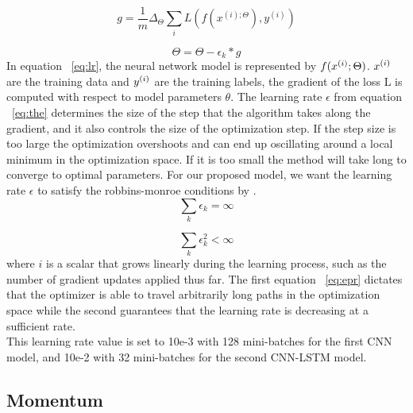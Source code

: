 \begin{equation}\label{eq:lr}
     g=\frac{1}{m}\Delta _{\Theta }\sum _{i}L(f(x^{(i);\Theta }), y^{(i)})
\end{equation}

\begin{equation}\label{eq:the}
    \Theta =\Theta -\epsilon _{k}*g
\end{equation}
In equation ~\ref{eq:lr}, the neural network model is represented by $\large f(x^{(i)};\Theta )$. $\large x^{(i)}$ are the training data and $\large y^{(i)}$  are the training labels, the gradient of the loss L is computed with respect to model parameters $\theta$. The learning rate $\epsilon$ from equation ~\ref{eq:the} determines the size of the step that the algorithm takes along the gradient, and it also controls the size of the optimization step. If the step size is too large the optimization overshoots and can end up oscillating around a local minimum in the optimization space. If it is too small the method will take long to converge to optimal parameters. For our proposed model, we want the learning rate $\epsilon$ to satisfy the robbins-monroe conditions by \cite{lecun2015deep}.
\begin{equation}\label{eq:epr}
     \sum _{k}\epsilon _{k}=\infty
\end{equation}

\begin{equation}
    \sum _{k}\epsilon _{k}^{2}< \infty
\end{equation}
where $i$ is a scalar that grows linearly during the learning process, such as
the number of gradient updates applied thus far. The first equation ~\ref{eq:epr} dictates that the optimizer is able to travel arbitrarily long paths in the optimization
space while the second guarantees that the learning rate is decreasing at a
sufficient rate.\\

This learning rate value is set to 10e-3 with 128 mini-batches for the first CNN model, and 10e-2 with 32 mini-batches for the second CNN-LSTM model.

\subsection{Momentum}

